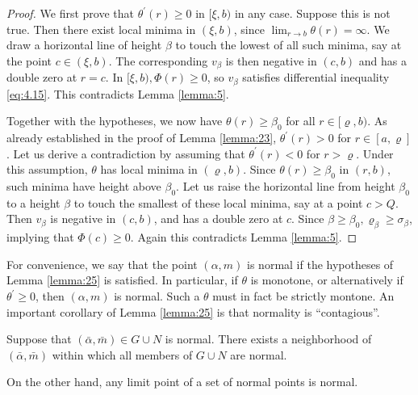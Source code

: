 \begin{proof}
  We first prove that $\theta^{\prime}(r) \geq 0$ in $[\xi, b)$ in any case.
  Suppose this is not true. Then there exist local minima in $(\xi, b)$,
  since $\lim _{r \rightarrow b} \theta(r)=\infty$.
  We draw a horizontal line of height $\beta$ to touch the lowest of all such minima,
  say at the point $c \in(\xi, b)$.
  The corresponding $v_\beta$ is then negative in $(c, b)$ and has a double zero at $r=c$.
  In $[\xi, b), \Phi(r) \geq 0$, so $v_\beta$ satisfies differential inequality \eqref{eq:4.15}.
  This contradicts Lemma \ref{lemma:5}.
  
  Together with the hypotheses, we now have $\theta(r) \geq \beta_0$
  for all $r \in[\varrho, b)$.
  As already established in the proof of Lemma \ref{lemma:23},
  $\theta^{\prime}(r)>0$ for $r \in[a, \varrho]$.
  Let us derive a contradiction by assuming that $\theta^{\prime}(r)<0$ for $r>\varrho$.
  Under this assumption, $\theta$ has local minima in $(\varrho, b)$.
  Since $\theta(r) \geq \beta_0$ in $(r, b)$, such minima have height above $\beta_0$.
  Let us raise the horizontal line from height $\beta_0$ to a height $\beta$
  to touch the smallest of these local minima, say at a point $c>Q$.
  Then $v_\beta$ is negative in $(c, b)$, and has a double zero at $c$.
  Since $\beta \geq \beta_0, \varrho_\beta \geq \sigma_\beta$,
  implying that $\Phi(c) \geq 0$. Again this contradicts Lemma \ref{lemma:5}.
\end{proof}

For convenience, we say that the point $(\alpha, m)$ is normal
if the hypotheses of Lemma \ref{lemma:25} is satisfied. In particular, if $\theta$ is monotone,
or alternatively if $\theta^{\prime} \geq 0$, then $(\alpha, m)$ is normal.
Such a $\theta$ must in fact be strictly montone. An important corollary of Lemma \ref{lemma:25}
is that normality is ``contagious''.

\begin{lemma}\label{lemma:26}
  Suppose that $(\bar{\alpha}, \bar{m}) \in G \cup N$ is normal.
  There exists a neighborhood of $(\bar{\alpha}, \bar{m})$ within which all members of $G \cup N$ are normal.
\end{lemma}

On the other hand, any limit point of a set of normal points is normal.

